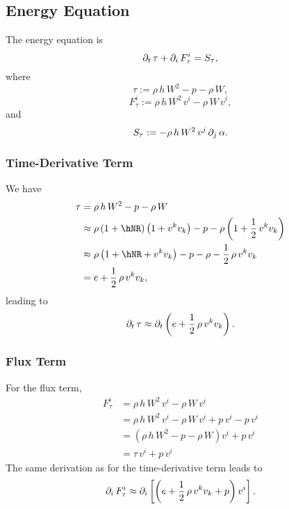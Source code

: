 \subsection{Energy Equation}

The energy equation is
\begin{equation}
  \partial_{t}\,\tau+\partial_{i}\,F^{i}_{\tau}=S_{\tau},
\end{equation}
where
\begin{equation}
  \tau:=\rho\,h\,W^{2}-p-\rho\,W,
\end{equation}
\begin{equation}
  F^{i}_{\tau}:=\rho\,h\,W^{2}\,v^{i}-\rho\,W\,v^{i},
\end{equation}
and
\begin{equation}
  S_{\tau}:=-\rho\,h\,W^{2}\,v^{j}\,\partial_{j}\,\alpha.
\end{equation}

\subsubsection{Time-Derivative Term}

We have
\begin{align}
  \tau&=\rho\,h\,W^{2}-p-\rho\,W \\
  &\approx\rho\left(1+\hNR\right)\left(1+v^{k}v_{k}\right)
  -p-\rho\left(1+\frac{1}{2}\,v^{k}v_{k}\right) \\
  &\approx\rho\left(1+\hNR+v^{k}v_{k}\right)
  -p-\rho-\frac{1}{2}\,\rho\,v^{k}v_{k} \\
  &=e+\frac{1}{2}\,\rho\,v^{k}v_{k},
\end{align}
leading to
\begin{equation}
  \partial_{t}\,\tau\approx\partial_{t}\left(e+\frac{1}{2}\,\rho\,v^{k}v_{k}\right).
\end{equation}

\subsubsection{Flux Term}

For the flux term,
\begin{align}
  F^{i}_{\tau}&=\rho\,h\,W^{2}\,v^{i}-\rho\,W\,v^{i} \\
  &=\rho\,h\,W^{2}\,v^{i}-\rho\,W\,v^{i}+p\,v^{i}-p\,v^{i} \\
  &=\left(\rho\,h\,W^{2}-p-\rho\,W\right)v^{i}+p\,v^{i} \\
  &=\tau\,v^{i}+p\,v^{i}
\end{align}
The same derivation as for the time-derivative term leads to
\begin{equation}
  \partial_{i}\,F^{i}_{\tau}
  \approx\partial_{i}\left[\left(e+\frac{1}{2}\,\rho\,v^{k}v_{k}+p\right)v^{i}\right].
\end{equation}

